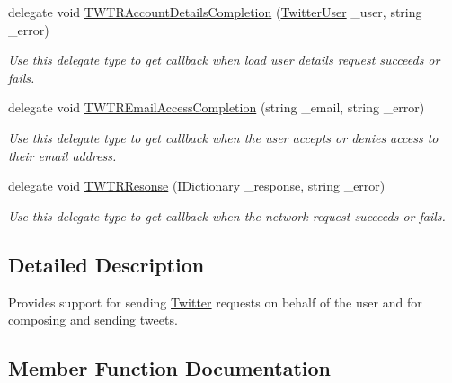 \begin{DoxyCompactItemize}
delegate void \hyperlink{class_voxel_busters_1_1_native_plugins_1_1_twitter_a547ee925356415ce1472068ed1011ce3}{T\+W\+T\+R\+Account\+Details\+Completion} (\hyperlink{class_voxel_busters_1_1_native_plugins_1_1_twitter_user}{Twitter\+User} \+\_\+user, string \+\_\+error)
\begin{DoxyCompactList}\small\item\em Use this delegate type to get callback when load user details request succeeds or fails. \end{DoxyCompactList}\item 
delegate void \hyperlink{class_voxel_busters_1_1_native_plugins_1_1_twitter_ae65acbb90b23780b10cc2881d1739bb7}{T\+W\+T\+R\+Email\+Access\+Completion} (string \+\_\+email, string \+\_\+error)
\begin{DoxyCompactList}\small\item\em Use this delegate type to get callback when the user accepts or denies access to their email address. \end{DoxyCompactList}\item 
delegate void \hyperlink{class_voxel_busters_1_1_native_plugins_1_1_twitter_a75983752eed2d648d967943ca91eb9aa}{T\+W\+T\+R\+Resonse} (I\+Dictionary \+\_\+response, string \+\_\+error)
\begin{DoxyCompactList}\small\item\em Use this delegate type to get callback when the network request succeeds or fails. \end{DoxyCompactList}\end{DoxyCompactItemize}


\subsection{Detailed Description}
Provides support for sending \hyperlink{class_voxel_busters_1_1_native_plugins_1_1_twitter}{Twitter} requests on behalf of the user and for composing and sending tweets. 



\subsection{Member Function Documentation}
\hypertarget{class_voxel_busters_1_1_native_plugins_1_1_twitter_a9949714add72302695128d30d824f7a7}{}

